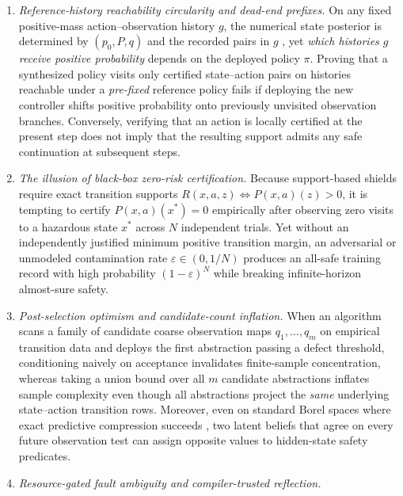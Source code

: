 \documentclass[11pt,a4paper]{article}
\providecommand{\tightlist}{\setlength{\itemsep}{2pt}\setlength{\parskip}{0pt}}
\begin{document}
\begin{enumerate}
\def\labelenumi{\arabic{enumi}.}
\tightlist
\item
  \emph{Reference-history reachability circularity and dead-end
  prefixes.} On any fixed positive-mass action--observation history
  \(g\), the numerical state posterior is determined by \((p_0, P, q)\)
  and the recorded pairs in \(g\)
  \citep{astrom1965, smallwoodSondik1973, kaelbling1998}, yet
  \emph{which histories \(g\) receive positive probability} depends on
  the deployed policy \(\pi\). Proving that a synthesized policy visits
  only certified state--action pairs on histories reachable under a
  \emph{pre-fixed} reference policy fails if deploying the new
  controller shifts positive probability onto previously unvisited
  observation branches. Conversely, verifying that an action is locally
  certified at the present step does not imply that the resulting
  support admits any safe continuation at subsequent steps.
\item
  \emph{The illusion of black-box zero-risk certification.} Because
  support-based shields require exact transition supports
  \(R(x,a,z) \iff P(x,a)(z) > 0\), it is tempting to certify
  \(P(x,a)(x^*) = 0\) empirically after observing zero visits to a
  hazardous state \(x^*\) across \(N\) independent trials. Yet without
  an independently justified minimum positive transition margin, an
  adversarial or unmodeled contamination rate
  \(\varepsilon \in (0, 1/N)\) produces an all-safe training record with
  high probability \((1-\varepsilon)^N\) while breaking infinite-horizon
  almost-sure safety.
\item
  \emph{Post-selection optimism and candidate-count inflation.} When an
  algorithm scans a family of candidate coarse observation maps
  \(q_1, \dots, q_m\) on empirical transition data and deploys the first
  abstraction passing a defect threshold, conditioning naively on
  acceptance invalidates finite-sample concentration, whereas taking a
  union bound over all \(m\) candidate abstractions inflates sample
  complexity even though all abstractions project the \emph{same}
  underlying state--action transition rows. Moreover, even on standard
  Borel spaces where exact predictive compression succeeds
  \citep{crutchfieldYoung1989, shaliziCrutchfield2001, barnettCrutchfield2015},
  two latent beliefs that agree on every future observation test can
  assign opposite values to hidden-state safety predicates.
\item
  \emph{Resource-gated fault ambiguity and compiler-trusted reflection.}

\end{enumerate}
\end{document}
